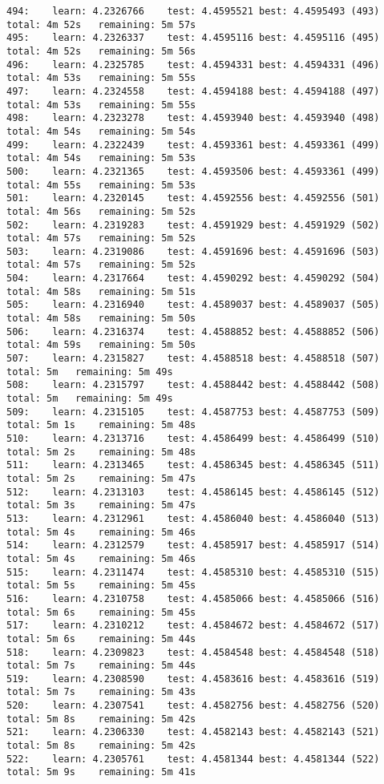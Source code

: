 \documentclass[11pt]{article}
\begin{document}
\begin{Verbatim}[commandchars=\\\{\}]
494:	learn: 4.2326766	test: 4.4595521	best: 4.4595493 (493)	total: 4m 52s	remaining: 5m 57s
495:	learn: 4.2326337	test: 4.4595116	best: 4.4595116 (495)	total: 4m 52s	remaining: 5m 56s
496:	learn: 4.2325785	test: 4.4594331	best: 4.4594331 (496)	total: 4m 53s	remaining: 5m 55s
497:	learn: 4.2324558	test: 4.4594188	best: 4.4594188 (497)	total: 4m 53s	remaining: 5m 55s
498:	learn: 4.2323278	test: 4.4593940	best: 4.4593940 (498)	total: 4m 54s	remaining: 5m 54s
499:	learn: 4.2322439	test: 4.4593361	best: 4.4593361 (499)	total: 4m 54s	remaining: 5m 53s
500:	learn: 4.2321365	test: 4.4593506	best: 4.4593361 (499)	total: 4m 55s	remaining: 5m 53s
501:	learn: 4.2320145	test: 4.4592556	best: 4.4592556 (501)	total: 4m 56s	remaining: 5m 52s
502:	learn: 4.2319283	test: 4.4591929	best: 4.4591929 (502)	total: 4m 57s	remaining: 5m 52s
503:	learn: 4.2319086	test: 4.4591696	best: 4.4591696 (503)	total: 4m 57s	remaining: 5m 52s
504:	learn: 4.2317664	test: 4.4590292	best: 4.4590292 (504)	total: 4m 58s	remaining: 5m 51s
505:	learn: 4.2316940	test: 4.4589037	best: 4.4589037 (505)	total: 4m 58s	remaining: 5m 50s
506:	learn: 4.2316374	test: 4.4588852	best: 4.4588852 (506)	total: 4m 59s	remaining: 5m 50s
507:	learn: 4.2315827	test: 4.4588518	best: 4.4588518 (507)	total: 5m	remaining: 5m 49s
508:	learn: 4.2315797	test: 4.4588442	best: 4.4588442 (508)	total: 5m	remaining: 5m 49s
509:	learn: 4.2315105	test: 4.4587753	best: 4.4587753 (509)	total: 5m 1s	remaining: 5m 48s
510:	learn: 4.2313716	test: 4.4586499	best: 4.4586499 (510)	total: 5m 2s	remaining: 5m 48s
511:	learn: 4.2313465	test: 4.4586345	best: 4.4586345 (511)	total: 5m 2s	remaining: 5m 47s
512:	learn: 4.2313103	test: 4.4586145	best: 4.4586145 (512)	total: 5m 3s	remaining: 5m 47s
513:	learn: 4.2312961	test: 4.4586040	best: 4.4586040 (513)	total: 5m 4s	remaining: 5m 46s
514:	learn: 4.2312579	test: 4.4585917	best: 4.4585917 (514)	total: 5m 4s	remaining: 5m 46s
515:	learn: 4.2311474	test: 4.4585310	best: 4.4585310 (515)	total: 5m 5s	remaining: 5m 45s
516:	learn: 4.2310758	test: 4.4585066	best: 4.4585066 (516)	total: 5m 6s	remaining: 5m 45s
517:	learn: 4.2310212	test: 4.4584672	best: 4.4584672 (517)	total: 5m 6s	remaining: 5m 44s
518:	learn: 4.2309823	test: 4.4584548	best: 4.4584548 (518)	total: 5m 7s	remaining: 5m 44s
519:	learn: 4.2308590	test: 4.4583616	best: 4.4583616 (519)	total: 5m 7s	remaining: 5m 43s
520:	learn: 4.2307541	test: 4.4582756	best: 4.4582756 (520)	total: 5m 8s	remaining: 5m 42s
521:	learn: 4.2306330	test: 4.4582143	best: 4.4582143 (521)	total: 5m 8s	remaining: 5m 42s
522:	learn: 4.2305761	test: 4.4581344	best: 4.4581344 (522)	total: 5m 9s	remaining: 5m 41s

\end{Verbatim}
\end{document}
